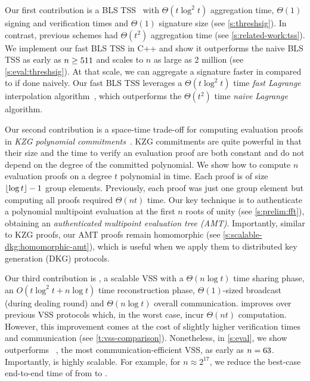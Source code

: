 Our first contribution is a BLS TSS~\cite{Boldyreva2003Threshold} with $\Theta(t\log^2{t})$ aggregation time, $\Theta(1)$ signing and verification times and $\Theta(1)$ signature size (see \cref{s:threshsig}).
In contrast, previous schemes had $\Theta(t^2)$ aggregation time (see \cref{s:related-work:tss}).
We implement our fast BLS TSS in C++ and show it outperforms the naive BLS TSS as early as $n\ge 511$ and scales to $n$ as large as 2 million (see \cref{s:eval:threshsig}).
At that scale, we can aggregate a signature  faster in  compared to  if done naively.
Our fast BLS TSS leverages a $\Theta(t\log^2{t})$ time \textit{fast Lagrange} interpolation algorithm~\cite{moderncomputeralgebra-ch10}, which outperforms the $\Theta(t^2)$ time \textit{naive} \textit{Lagrange} algorithm.

Our second contribution is a space-time trade-off for computing evaluation proofs in \textit{KZG polynomial commitments}~\cite{polycommit}.
KZG commitments are quite powerful in that their size and the time to verify an evaluation proof are both constant and do not depend on the degree of the committed polynomial.
We show how to compute $n$ evaluation proofs on a degree $t$ polynomial in \amtDealTime time.
Each proof is of size $\lfloor\log{t}\rfloor-1$ group elements.
Previously, each proof was just one group element but computing all proofs required $\Theta(nt)$ time.
Our key technique is to authenticate a polynomial multipoint evaluation at the first $n$ roots of unity (see \cref{s:prelim:fft}), obtaining an \textit{authenticated multipoint evaluation tree (AMT)}.
Importantly, similar to KZG proofs, our AMT proofs remain homomorphic (see \cref{s:scalable-dkg:homomorphic-amt}), which is useful when we apply them to distributed key generation (DKG) protocols.

Our third contribution is \ourvss, a scalable VSS with a $\Theta(n\log{t})$ time sharing phase, an $O(t\log^2{t}+n\log{t})$ time reconstruction phase, $\Theta(1)$-sized broadcast (during dealing round) and $\Theta(n\log{t})$ overall communication.
\ourvss improves over previous VSS protocols which, in the worst case, incur $\Theta(nt)$ computation.
However, this improvement comes at the cost of slightly higher verification times and communication (see \cref{t:vss-comparison}).
Nonetheless, in \cref{s:eval}, we show \ourvss outperforms \evss~\cite{polycommit}, the most communication-efficient VSS, as early as $n=63$. 
Importantly, \ourvss is highly scalable. 
For example, for $n\approx 2^{17}$, we reduce the best-case end-to-end time of \evss from  to .

